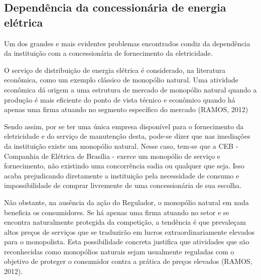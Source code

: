 \subsection{Dependência da concessionária de energia elétrica}
Um dos grandes e mais evidentes problemas encontrados condiz da dependência da instituição com a concessionária de fornecimento da eletricidade.
\par O serviço de distribuição de energia elétrica é considerado, na literatura econômica, como um exemplo clássico de monopólio natural. Uma atividade econômica dá origem a uma estrutura de mercado de monopólio natural quando a produção é mais eficiente do ponto de vista técnico e econômico quando há apenas uma firma atuando no segmento específico do mercado (RAMOS, 2012)
\par Sendo assim, por se ter uma única empresa disponível para o fornecimento da eletricidade e do serviço de manutenção desta, pode-se dizer que nas imediações da instituição existe um monopólio natural. Nesse caso, tem-se que a CEB - Companhia de Elétrica de Brasília - exerce um monopólio de serviço e fornecimento, não existindo uma concorrência sadia ou qualquer que seja. Isso acaba prejudicando diretamente a instituição pela necessidade de consumo e impossibilidade de comprar livremente de uma concessionária de sua escolha.
\par Não obstante, na ausência da ação do Regulador, o monopólio natural em nada beneficia os consumidores. Se há apenas uma firma atuando no setor e se encontra naturalmente protegida da competição, a tendência é que prevaleçam altos preços de serviços que se traduzirão em lucros extraordinariamente elevados para o monopolista. Esta possibilidade concreta justifica que atividades que são reconhecidas como monopólios naturais sejam usualmente reguladas com o objetivo de proteger o consumidor contra a prática de preços elevados (RAMOS, 2012).